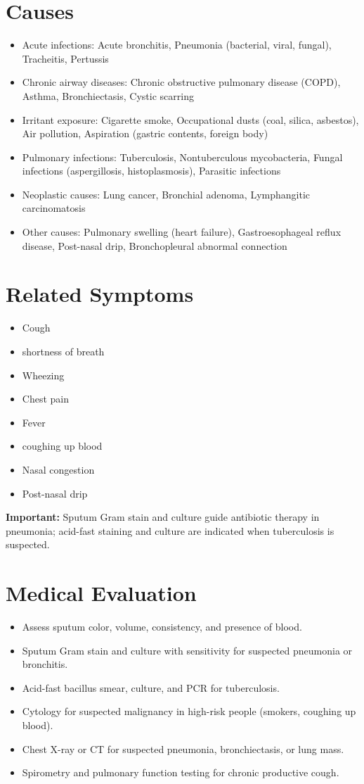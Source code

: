 \section*{Causes}
\begin{itemize}
  \item Acute infections: Acute bronchitis, Pneumonia (bacterial, viral, fungal), Tracheitis, Pertussis
  \item Chronic airway diseases: Chronic obstructive pulmonary disease (COPD), Asthma, Bronchiectasis, Cystic scarring
  \item Irritant exposure: Cigarette smoke, Occupational dusts (coal, silica, asbestos), Air pollution, Aspiration (gastric contents, foreign body)
  \item Pulmonary infections: Tuberculosis, Nontuberculous mycobacteria, Fungal infections (aspergillosis, histoplasmosis), Parasitic infections
  \item Neoplastic causes: Lung cancer, Bronchial adenoma, Lymphangitic carcinomatosis
  \item Other causes: Pulmonary swelling (heart failure), Gastroesophageal reflux disease, Post-nasal drip, Bronchopleural abnormal connection
\end{itemize}

\section*{Related Symptoms}
\begin{itemize}
  \item Cough
  \item shortness of breath
  \item Wheezing
  \item Chest pain
  \item Fever
  \item coughing up blood
  \item Nasal congestion
  \item Post-nasal drip
\end{itemize}
\textbf{Important:} Sputum Gram stain and culture guide antibiotic therapy in pneumonia; acid-fast staining and culture are indicated when tuberculosis is suspected.

\section*{Medical Evaluation}
\begin{itemize}
  \item Assess sputum color, volume, consistency, and presence of blood.
  \item Sputum Gram stain and culture with sensitivity for suspected pneumonia or bronchitis.
  \item Acid-fast bacillus smear, culture, and PCR for tuberculosis.
  \item Cytology for suspected malignancy in high-risk people (smokers, coughing up blood).
  \item Chest X-ray or CT for suspected pneumonia, bronchiectasis, or lung mass.
  \item Spirometry and pulmonary function testing for chronic productive cough.
\end{itemize}

